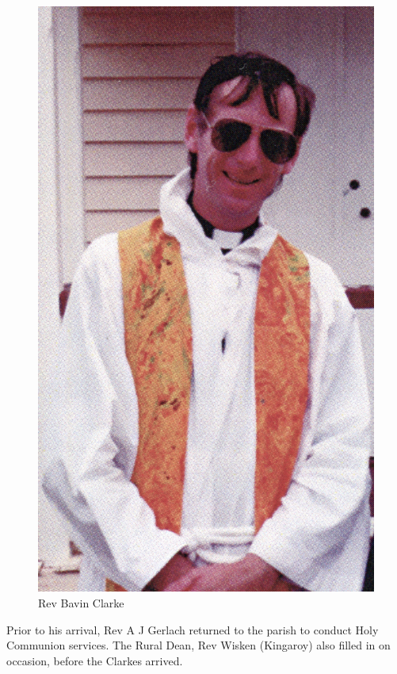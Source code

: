 \begin{figure}
\begin{center}
\includegraphics[width=1.\linewidth,center]{../images/bavin.jpg}
\caption{Rev Bavin Clarke}
\end{center}
\end{figure}




Prior to his arrival, Rev A J Gerlach returned to the parish to conduct Holy Communion services. The Rural Dean, Rev Wisken (Kingaroy) also filled in on occasion, before the Clarkes arrived.




